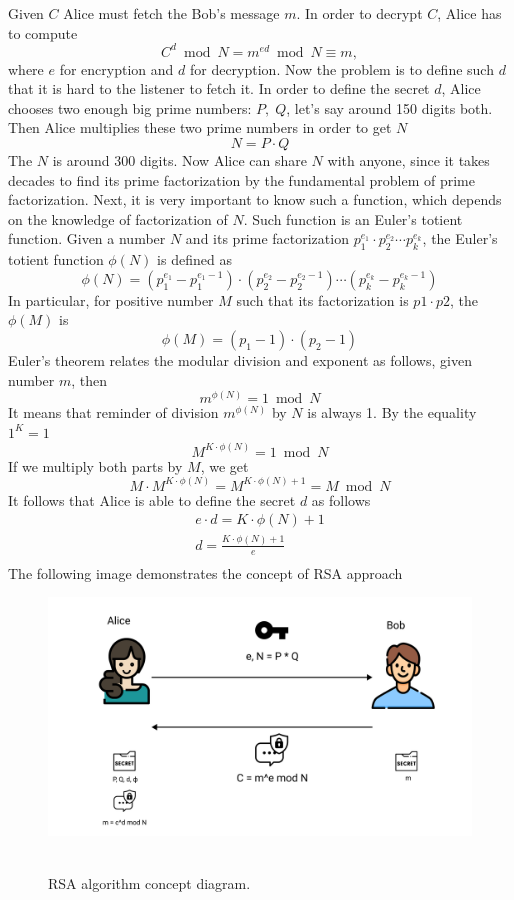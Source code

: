 \documentclass[12pt,letterpaper,oneside,reqno]{amsart}
\begin{document}
    Given $C$ Alice must fetch the Bob's message $m$.
    In order to decrypt $C$, Alice has to compute
    \[
        C^d \bmod N = m^{ed} \bmod N \equiv m,
    \]
    where $e$ for encryption and $d$ for decryption.
    Now the problem is to define such $d$ that it is hard to the listener to fetch it.
    In order to define the secret $d$, Alice chooses two enough big prime numbers: $P, \; Q$, let's say around 150 digits
    both.
    Then Alice multiplies these two prime numbers in order to get $N$
    \[
        N = P \cdot Q
    \]
    The $N$ is around 300 digits.
    Now Alice can share $N$ with anyone, since it takes decades to find its prime factorization by the fundamental problem
    of prime factorization.
    Next, it is very important to know such a function, which depends on the knowledge of factorization of $N$.
    Such function is an Euler's totient function.
    Given a number $N$ and its prime factorization $p_1^{e_1}\cdot p_2^{e_2} \cdots p_k^{e_k}$, the Euler's totient function
    $\phi(N)$ is defined as
    \[
        \phi(N) = (p_1^{e_1} - p_1^{e_1 - 1}) \cdot (p_2^{e_2} - p_2^{e_2 - 1}) \cdots (p_k^{e_k} - p_k^{e_k - 1})
    \]
    In particular, for positive number $M$ such that its factorization is $p1 \cdot p2$, the $\phi(M)$ is
    \[
        \phi(M) = (p_1 -1) \cdot (p_2 - 1)
    \]
    Euler's theorem relates the modular division and exponent as follows, given number $m$, then
    \[
        m^{\phi(N)} = 1 \bmod N
    \]
    It means that reminder of division $m^{\phi(N)}$ by $N$ is always 1.
    By the equality $1^K = 1$
    \[
        M^{K \cdot \phi(N)} = 1 \bmod N
    \]
    If we multiply both parts by $M$, we get
    \[
        M \cdot M^{K \cdot \phi(N)} = M^{K \cdot \phi(N) + 1} = M \bmod N
    \]
    It follows that Alice is able to define the secret $d$ as follows
    \begin{gather*}
        e \cdot d = K \cdot \phi(N) + 1\\
        d = \frac{K \cdot \phi(N) + 1}{e}\\
    \end{gather*}
    The following image demonstrates the concept of RSA approach
    \begin{figure}[H]
        \centering
        \includegraphics[width=1\textwidth]{12_RSA_encryption_concept_diagram}
        ~\caption{RSA algorithm concept diagram.}\label{fig:figure8}
    \end{figure}
\end{document}
